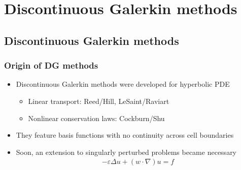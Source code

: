 \section[DG]{Discontinuous Galerkin methods}

\subsection{Discontinuous Galerkin methods}

\begin{frame}
  \frametitle{Origin of DG methods}
  \begin{itemize}
  \item Discontinuous Galerkin methods were developed for hyperbolic PDE
    \begin{itemize}
    \item Linear transport: Reed/Hill, LeSaint/Raviart
    \item Nonlinear conservation laws: Cockburn/Shu
    \end{itemize}
  \item They feature basis functions with no continuity across cell boundaries
  \item Soon, an extension to singularly perturbed problems became
    necessary
    \begin{gather*}
      -\varepsilon\Delta u + (w\!\cdot\!\nabla) u = f
    \end{gather*}
  \end{itemize}
\end{frame}


